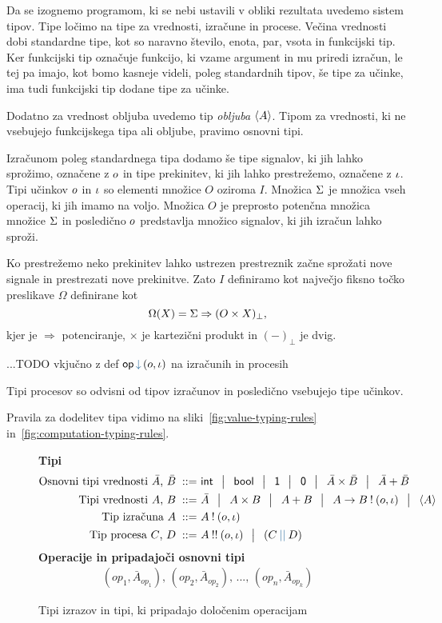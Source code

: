 Da se izognemo programom, ki se nebi ustavili v obliki rezultata uvedemo sistem tipov.
Tipe ločimo na tipe za vrednosti, izračune in procese.
Večina vrednosti dobi standardne tipe, kot so naravno število, enota, par, vsota in funkcijski tip. 
Ker funkcijski tip označuje funkcijo, ki vzame argument in mu priredi izračun, le tej pa imajo, kot bomo kasneje videli, poleg standardnih tipov, še tipe za učinke, ima tudi funkcijski tip dodane tipe za učinke.

Dodatno za vrednost obljuba uvedemo tip \emph{obljuba} $\langle A \rangle$. 
Tipom za vrednosti, ki ne vsebujejo funkcijskega tipa ali obljube, pravimo osnovni tipi. 


Izračunom poleg standardnega tipa dodamo še tipe signalov, ki jih lahko sprožimo, označene z $o$ in tipe prekinitev, ki jih lahko prestrežemo, označene z $\iota$.
Tipi učinkov $o$ in $\iota$ so elementi množice $O$ oziroma $I$.
Množica $\Sigma$ je množica vseh operacij, ki jih imamo na voljo.
Množica $O$ je preprosto potenčna množica množice $\Sigma$ in posledično $o$ predstavlja množico signalov, ki jih izračun lahko sproži.

Ko prestrežemo neko prekinitev lahko ustrezen prestreznik začne sprožati nove signale in prestrezati nove prekinitve. Zato $I$ definiramo kot največjo fiksno točko preslikave $\Omega$ definirane kot 
$$\Omega(X) = \Sigma \Rightarrow (O \times X)_\bot ,$$
kjer je $\Rightarrow$ potenciranje, $\times$ je kartezični produkt in $(-)_\bot$ je dvig.

...TODO vkjučno z def $\opincomp{op}{(\o, \i)}$ na izračunih in procesih

Tipi procesov so odvisni od tipov izračunov in posledično vsebujejo tipe učinkov.

Pravila za dodelitev tipa vidimo na sliki~\ref{fig:value-typing-rules} in~\ref{fig:computation-typing-rules}.


\begin{figure}[H]
	\centering
	\small
	\textbf{Tipi}
	\begin{align*}
	\text{Osnovni tipi vrednosti $\bar{A}$, $\bar{B}$}
	\bnfis & \tysym{int} \,\bnfor\! \tysym{bool} \,\bnfor\! \tyunit \,\bnfor\! \tyempty \,\bnfor\! \typrod{\bar{A}}{\bar{B}} \,\bnfor\! \tysum{\bar{A}}{\bar{B}}
	\\%
	\text{Tipi vrednosti $A$, $B$}
	\bnfis & \bar{A} \, \bnfor\! \typrod{A}{B} \,\bnfor\! \tysum{A}{B} \,\bnfor\! \tyfun{A}{\tycomp{B}{\o,\i}} \,\bnfor\! \typromise{A}
	\\
	\text{Tip izračuna $A$} \bnfis& \tycomp{A}{\o,\i}
	\\
	\text{Tip procesa $\tyC$, $\tyD$}  \bnfis & \tyrun{A}{\o, \i} \,\bnfor\! \typar{\tyC}{\tyD}
	\end{align*}
	\textbf{Operacije in pripadajoči osnovni tipi}
	\begin{align*}
		(op_1, \bar{A}_{op_1}),\, (op_2, \bar{A}_{op_2}),\, ... ,\, (op_n, \bar{A}_{op_k})
	\end{align*}
	\caption{Tipi izrazov in tipi, ki pripadajo določenim operacijam}
	\label{fig:tipi}
\end{figure}

